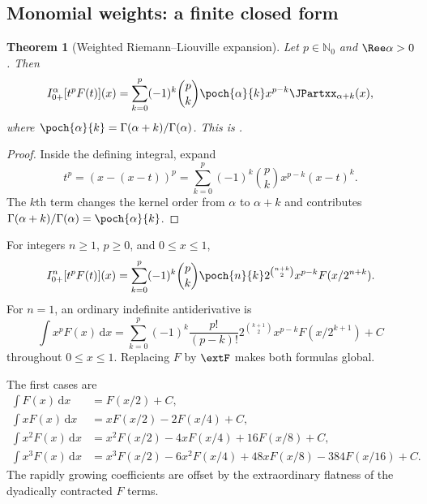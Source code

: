 \documentclass[11pt,oneside]{article}
\newtheorem{theorem}{Theorem}[section]
\theoremstyle{definition}
\theoremstyle{remark}
\newcommand{\N}{\mathbb N}
\newcommand{\dd}{\,\mathrm d}
\newcommand{\1}{\mathbf 1}
\begin{document}
\subsection{Monomial weights: a finite closed form}

\begin{theorem}[Weighted Riemann--Liouville expansion]
\label{p7:thm:weighted-RL}
Let $p\in\N_0$ and $\Ree\alpha>0$.  Then
\begin{equation}
 I_{0+}^{\alpha}[t^pF(t)](x)
 =\sum_{k=0}^{p}(-1)^k\binom pk\poch{\alpha}{k}
 x^{p-k}\JPartxx_{\alpha+k}(x),
 \label{p7:eq:weighted-RL}
\end{equation}
where $\poch{\alpha}{k}=\Gamma(\alpha+k)/\Gamma(\alpha)$.  This is \statusproved.
\end{theorem}

\begin{proof}
Inside the defining integral, expand
\[
 t^p=(x-(x-t))^p
 =\sum_{k=0}^p(-1)^k\binom pkx^{p-k}(x-t)^k.
\]
The $k$th term changes the kernel order from $\alpha$ to $\alpha+k$ and contributes
$\Gamma(\alpha+k)/\Gamma(\alpha)=\poch{\alpha}{k}$.
\end{proof}

\begin{corollary}
\label{p7:cor:nth-weighted-primitive}
For integers $n\ge1$, $p\ge0$, and $0\le x\le1$,
\begin{equation}
 I_{0+}^{n}[t^pF(t)](x)
 =\sum_{k=0}^{p}(-1)^k\binom pk\poch{n}{k}
 2^{\binom{n+k}{2}}x^{p-k}F(x/2^{n+k}).
 \label{p7:eq:nth-weighted-primitive}
\end{equation}
For $n=1$, an ordinary indefinite antiderivative is
\begin{equation}
 \boxed{
 \int x^pF(x)\dd x=
 \sum_{k=0}^{p}(-1)^k\frac{p!}{(p-k)!}
 2^{\binom{k+1}{2}}x^{p-k}F(x/2^{k+1})+C }
 \label{p7:eq:weighted-ordinary-antiderivative}
\end{equation}
throughout $0\le x\le1$.  Replacing $F$ by $\extF$ makes both formulas global.
\end{corollary}

\begin{example}
The first cases are
\begin{align*}
 \int F(x)\dd x&=F(x/2)+C,\\
 \int xF(x)\dd x&=xF(x/2)-2F(x/4)+C,\\
 \int x^2F(x)\dd x&=x^2F(x/2)-4xF(x/4)+16F(x/8)+C,\\
 \int x^3F(x)\dd x&=x^3F(x/2)-6x^2F(x/4)+48xF(x/8)-384F(x/16)+C.
\end{align*}
The rapidly growing coefficients are offset by the extraordinary flatness of the dyadically
contracted $F$ terms.
\end{example}
\end{document}
